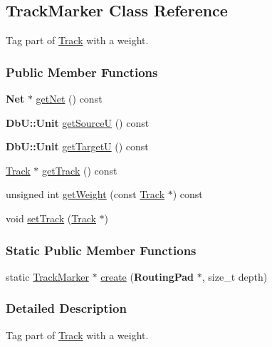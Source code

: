 \hypertarget{classKite_1_1TrackMarker}{\subsection{Track\-Marker Class Reference}
\label{classKite_1_1TrackMarker}
}


Tag part of \hyperlink{classKite_1_1Track}{Track} with a weight.  


\subsubsection*{Public Member Functions}
\begin{DoxyCompactItemize}
\item 
{\bf Net} $\ast$ \hyperlink{classKite_1_1TrackMarker_adf3e1a980233163de0ca34a5c3575998}{get\-Net} () const 
\item 
{\bf Db\-U\-::\-Unit} \hyperlink{classKite_1_1TrackMarker_a3932d5ce9094ead510e4e33bd4e78e1a}{get\-Source\-U} () const 
\item 
{\bf Db\-U\-::\-Unit} \hyperlink{classKite_1_1TrackMarker_a8e5f2a51f56c6bdb74024ac77c08a22a}{get\-Target\-U} () const 
\item 
\hyperlink{classKite_1_1Track}{Track} $\ast$ \hyperlink{classKite_1_1TrackMarker_abfd8de286baf41eea066220773c7046d}{get\-Track} () const 
\item 
unsigned int \hyperlink{classKite_1_1TrackMarker_a16db9c2a378fb422fb2fd80e10084529}{get\-Weight} (const \hyperlink{classKite_1_1Track}{Track} $\ast$) const 
\item 
void \hyperlink{classKite_1_1TrackMarker_abd3d8093f871d3d1a7f24b053648026c}{set\-Track} (\hyperlink{classKite_1_1Track}{Track} $\ast$)
\end{DoxyCompactItemize}
\subsubsection*{Static Public Member Functions}
\begin{DoxyCompactItemize}
\item 
static \hyperlink{classKite_1_1TrackMarker}{Track\-Marker} $\ast$ \hyperlink{classKite_1_1TrackMarker_ab44a3705a23cba53cf68357de5673c04}{create} ({\bf Routing\-Pad} $\ast$, size\-\_\-t depth)
\end{DoxyCompactItemize}


\subsubsection{Detailed Description}
Tag part of \hyperlink{classKite_1_1Track}{Track} with a weight. 


